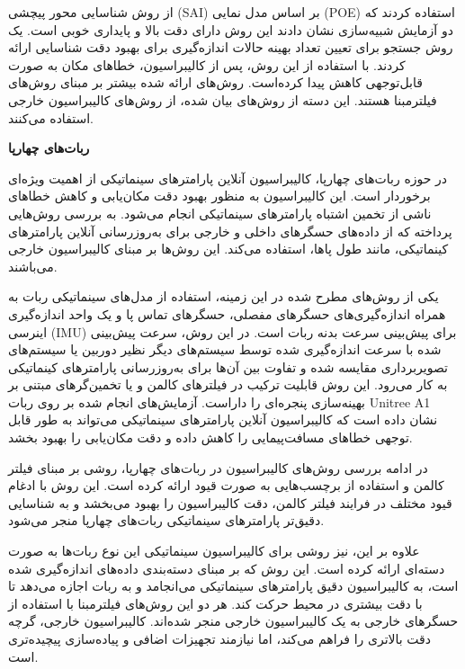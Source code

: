  \cite{wang2012screw} از روش شناسایی محور پیچشی (SAI) بر اساس مدل نمایی (POE) استفاده کردند که دو آزمایش شبیه‌سازی نشان دادند این روش دارای دقت بالا و پایداری خوبی است. \cite{li2011optimal} یک روش جستجو برای تعیین تعداد بهینه حالات اندازه‌گیری برای بهبود دقت شناسایی ارائه کردند. با استفاده از این روش، پس از کالیبراسیون، خطاهای مکان به صورت قابل‌توجهی کاهش پیدا کرده‌است. روش‌های ارائه شده بیشتر بر مبنای روش‌های فیلتر‌مبنا هستند. این دسته از روش‌های بیان شده، از روش‌های کالیبراسیون خارجی استفاده می‌کنند.
 
 \textbf{ربات‌های چهارپا}
 
در حوزه ربات‌های چهارپا، کالیبراسیون آنلاین پارامترهای سینماتیکی از اهمیت ویژه‌ای برخوردار است. این کالیبراسیون به منظور بهبود دقت مکان‌یابی و کاهش خطاهای ناشی از تخمین اشتباه پارامترهای سینماتیکی انجام می‌شود. 
\cite{yang2022online}
 به بررسی روش‌هایی پرداخته که از داده‌های حسگرهای داخلی و خارجی برای به‌روزرسانی آنلاین پارامترهای کینماتیکی، مانند طول پاها، استفاده می‌کند. این روش‌ها بر مبنای کالیبراسیون خارجی می‌باشند. 
 
 یکی از روش‌های مطرح شده در این زمینه، استفاده از مدل‌های سینماتیکی ربات به همراه اندازه‌گیری‌های حسگرهای مفصلی، حسگرهای تماس پا و یک واحد اندازه‌گیری اینرسی (IMU) برای پیش‌بینی سرعت بدنه ربات است. در این روش، سرعت پیش‌بینی شده با سرعت اندازه‌گیری شده توسط سیستم‌های دیگر نظیر دوربین یا سیستم‌های تصویربرداری مقایسه شده و تفاوت بین آن‌ها برای به‌روزرسانی پارامترهای کینماتیکی به کار می‌رود. این روش قابلیت ترکیب در فیلترهای کالمن و یا تخمین‌گرهای مبتنی بر بهینه‌سازی پنجره‌ای را داراست. آزمایش‌های انجام شده بر روی ربات Unitree A1 نشان داده است که کالیبراسیون آنلاین پارامترهای سینماتیکی می‌تواند به طور قابل توجهی خطاهای مسافت‌پیمایی را کاهش داده و دقت مکان‌یابی را بهبود بخشد.
 
 در ادامه بررسی روش‌های کالیبراسیون در ربات‌های چهارپا، \cite{blochliger2017foot} روشی بر مبنای فیلتر کالمن و استفاده از برچسب‌هایی به صورت قیود ارائه کرده است. این روش با ادغام قیود مختلف در فرایند فیلتر کالمن، دقت کالیبراسیون را بهبود می‌بخشد و به شناسایی دقیق‌تر پارامترهای سینماتیکی ربات‌های چهارپا منجر می‌شود. 
 
 علاوه بر این، \cite{bloesch2013kinematic} نیز روشی برای کالیبراسیون سینماتیکی این نوع ربات‌ها به صورت دسته‌ای ارائه کرده است. این روش که بر مبنای دسته‌بندی داده‌های اندازه‌گیری شده است، به کالیبراسیون دقیق پارامترهای سینماتیکی می‌انجامد و به ربات اجازه می‌دهد تا با دقت بیشتری در محیط حرکت کند.  هر دو این روش‌های فیلتر‌مبنا با استفاده از حسگرهای خارجی به یک کالیبراسیون خارجی منجر شده‌اند. کالیبراسیون خارجی، گرچه دقت بالاتری را فراهم می‌کند، اما نیازمند تجهیزات اضافی و پیاده‌سازی پیچیده‌تری است.
 
